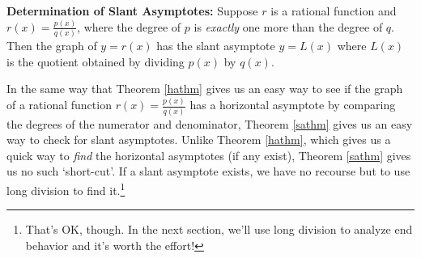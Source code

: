 \medskip

\colorbox{ResultColor}{\bbm

\begin{thm} \textbf{Determination of Slant Asymptotes:} \label{sathm} Suppose $r$ is a rational function and $r(x) = \frac{p(x)}{q(x)}$, where the degree of $p$ is \textit{exactly} one more than the degree of $q$.  Then the graph of $y=r(x)$ has  the slant asymptote $y=L(x)$ where $L(x)$ is the quotient obtained by dividing $p(x)$ by $q(x)$.

\end{thm}
\ebm}

\medskip

In the same way that Theorem \ref{hathm} gives us an easy way to see if the graph of a rational function $r(x) = \frac{p(x)}{q(x)}$ has a horizontal asymptote by comparing the degrees of the numerator and denominator, Theorem \ref{sathm} gives us an easy way to check for slant asymptotes.  Unlike Theorem \ref{hathm}, which gives us a quick way to \textit{find} the horizontal asymptotes (if any exist), Theorem \ref{sathm} gives us no such `short-cut'.  If a slant asymptote exists, we have no recourse but to use long division to find it.\footnote{That's OK, though.  In the next section, we'll use long division to analyze end behavior and it's worth the effort!}  

